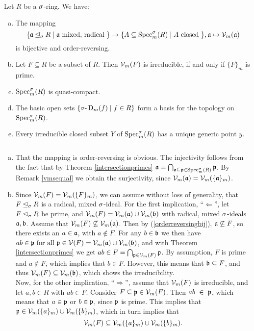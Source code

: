 \begin{prop}
Let $R$ be a $\sigma$-ring. We have:
\begin{enumerate}[(a)]
\item \label{vmbijection} The mapping 
$$\{ \mathfrak{a} \unlhd_{\sigma} R \mid \mathfrak{a}\text{ mixed, radical }\} \rightarrow \{ A \subseteq \operatorname{Spec}^\sigma_m(R) \mid A \text{ closed }\}, \mathfrak{a} \mapsto \mathcal{V}_m(\mathfrak{a})$$
 is bijective and order-reversing.
\item \label{irred=prime} Let $F \subseteq R$ be a subset of $R$. Then $\mathcal{V}_m(F)$ is irreducible, if and only if $\{F\}_m$ is prime.
\item $\operatorname{Spec}^\sigma_m(R)$ is quasi-compact.
\item The basic open sets $\{ \sigma\text{-}\operatorname{D}_m(f) \mid f \in R \}$ form a basis for the topology on $\operatorname{Spec}^\sigma_m(R)$.
\item Every irreducible closed subset $Y$ of $\operatorname{Spec}^\sigma_m(R)$ has a unique generic point $y$.
\end{enumerate}
\clearpage %
\begin{bew} $~$
\begin{enumerate}[(a)]
\item \label{orderreversingbij} That the mapping is order-reversing is obvious. The injectivity follows from the fact that by Theorem \ref{intersectionprimes} $\mathfrak{a} = \bigcap_{\mathfrak{a} \subseteq \mathfrak{p} \in \operatorname{Spec}^\sigma_m(R)} \mathfrak{p}$. By Remark \ref{vmsequal} we obtain the surjectivity,
 since $\mathcal{V}_m(\mathfrak{a}) = \mathcal{V}_m(\{\mathfrak{a}\}_m)$.
\item Since $\mathcal{V}_m(F) = \mathcal{V}_m(\{F\}_m)$, we can assume without loss of generality, that $F \unlhd_{\sigma} R$ is a radical, mixed $\sigma$-ideal.
For the first implication, ``$\Leftarrow$'', let $F \unlhd_{\sigma} R$ be prime, and $\mathcal{V}_m(F) = \mathcal{V}_m(\mathfrak{a}) \cup \mathcal{V}_m(\mathfrak{b})$ with radical, mixed $\sigma$-ideals $\mathfrak{a}, \mathfrak{b}$. Assume that $\mathcal{V}_m(F) \not\subseteq \mathcal{V}_m(\mathfrak{a})$. Then by (\ref{orderreversingbij}), $\mathfrak{a} \not \subseteq F$, so there exists an $a \in \mathfrak{a}$, with $a \notin F$.
For any $b \in \mathfrak{b}$ we then have $ab \in \mathfrak{p} \text{ for all } \mathfrak{p} \in \mathcal{V}(F) = \mathcal{V}_m(\mathfrak{a}) \cup \mathcal{V}_m(\mathfrak{b})$, and with Theorem \ref{intersectionprimes} we get $ab \in F = \bigcap_{\mathfrak{p} \in \mathcal{V}_m(F)}\mathfrak{p}$. By assumption, $F$ is prime and $a \notin F$, which implies
 that  $b \in F$. However, this means that $\mathfrak{b} \subseteq F$, and thus $\mathcal{V}_m(F) \subseteq \mathcal{V}_m(\mathfrak{b})$, which shows the irreducibility. \\
\indent Now, for the other implication, ``$\Rightarrow$'', assume that $\mathcal{V}_m(F)$ is irreducible, and let $a,b \in R$ with $ab \in F$. Consider $F \subseteq \mathfrak{p} \in \mathcal{V}_m(F)$. Then $ab~\in~\mathfrak{p}$, 
which means that $a \in \mathfrak{p}$ or $b \in \mathfrak{p}$, since $\mathfrak{p}$ is prime. This implies that $\mathfrak{p} \in \mathcal{V}_m(\{a\}_m) \cup \mathcal{V}_m(\{b\}_m)$, which in turn implies that $$\mathcal{V}_m(F) \subseteq \mathcal{V}_m(\{a\}_{m}) \cup \mathcal{V}_m(\{b\}_{m}).$$

\end{enumerate}
\end{bew}
\end{prop}
